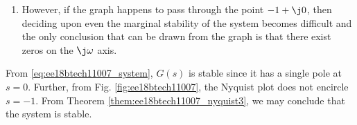 \begin{enumerate}[label=\thesubsection.\arabic*.,ref=\thesubsection.\theenumi]
\begin{enumerate}
\item However, if the graph happens to pass through the point $-1+\j0$, then deciding upon even the marginal stability of the system becomes difficult and the only conclusion that can be drawn from the graph is that there exist zeros on the $\j \omega$  axis.
\end{enumerate}
From \eqref{eq:ee18btech11007_system}, $G(s)$ is stable since it has a single pole at $s = 0$.  Further,  from Fig.  \ref{fig:ee18btech11007}, the Nyquist plot does not encircle $s =  -1$.  From  Theorem \ref{them:ee18btech11007_nyquist3}, we may conclude that the system is stable.


\end{enumerate}

